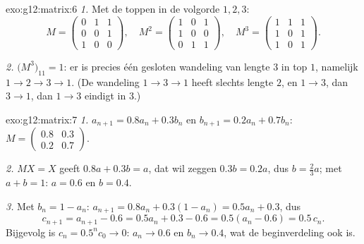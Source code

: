 \begin{solution}{exo:g12:matrix:6}
\emph{1.} Met de toppen in de volgorde $1, 2, 3$:
\[
M = \begin{pmatrix} 0&1&1\\ 0&0&1\\ 1&0&0\end{pmatrix}, \quad
M^2 = \begin{pmatrix} 1&0&1\\ 1&0&0\\ 0&1&1\end{pmatrix}, \quad
M^3 = \begin{pmatrix} 1&1&1\\ 1&0&1\\ 1&0&1 \end{pmatrix}.
\]

\emph{2.} $\bigl(M^3\bigr)_{11} = 1$: er is precies één gesloten wandeling van
lengte $3$ in top $1$, namelijk $1 \to 2 \to 3 \to 1$. (De wandeling
$1 \to 3 \to 1$ heeft slechts lengte $2$, en $1 \to 3$, dan $3\to1$, dan
$1\to3$ eindigt in $3$.)
\end{solution}

\begin{solution}{exo:g12:matrix:7}
\emph{1.} $a_{n+1} = 0.8a_n + 0.3b_n$ en $b_{n+1} = 0.2a_n + 0.7b_n$:
$M = \begin{pmatrix} 0.8 & 0.3\\ 0.2 & 0.7\end{pmatrix}$.

\emph{2.} $MX = X$ geeft $0.8a + 0.3b = a$, dat wil zeggen $0.3b = 0.2a$, dus
$b = \frac23 a$; met $a + b = 1$: $a = 0.6$ en $b = 0.4$.

\emph{3.} Met $b_n = 1 - a_n$:
$a_{n+1} = 0.8a_n + 0.3(1 - a_n) = 0.5a_n + 0.3$, dus
\[
c_{n+1} = a_{n+1} - 0.6 = 0.5a_n + 0.3 - 0.6 = 0.5(a_n - 0.6) = 0.5\,c_n .
\]
Bijgevolg is $c_n = 0.5^n c_0 \to 0$: $a_n \to 0.6$ en $b_n \to 0.4$, wat de
beginverdeling ook is.
\end{solution}

